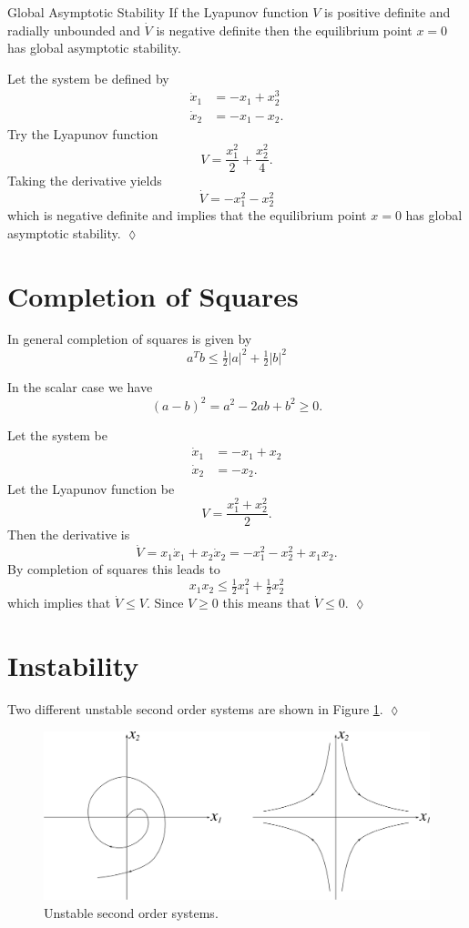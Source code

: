 \begin{theorem}{Global Asymptotic Stability}
If the Lyapunov function $V$ is positive definite and radially unbounded and $\dot{V}$ is negative definite then the equilibrium point $x=0$ has global asymptotic stability.
\end{theorem}

\begin{example}
Let the system be defined by
\begin{align*}
\dot{x}_1 &= -x_1 + x_2^3 \\
\dot{x}_2 &= -x_1 - x_2.
\end{align*}
Try the Lyapunov function
$$V = \frac{x_1^2}{2} + \frac{x_2^2}{4}.$$
Taking the derivative yields
$$\dot{V} = -x_1^2 - x_2^2$$
which is negative definite and implies that the equilibrium point $x=0$ has global asymptotic stability.
$\lozenge$
\end{example}

\section{Completion of Squares}
In general completion of squares is given by
$$a^Tb \leq \tfrac{1}{2}|a|^2 + \tfrac{1}{2}|b|^2$$

In the scalar case we have
$$(a-b)^2 = a^2 - 2ab + b^2 \geq 0.$$

\begin{example}
Let the system be
\begin{align*}
\dot{x}_1 &= -x_1 + x_2 \\
\dot{x}_2 &= -x_2.
\end{align*}
Let the Lyapunov function be
$$V = \frac{x_1^2+x_2^2}{2}.$$
Then the derivative is
$$\dot{V} = x_1\dot{x}_1 + x_2\dot{x}_2 = -x_1^2 - x_2^2 + x_1x_2.$$
By completion of squares this leads to
$$x_1x_2 \leq \tfrac{1}{2}x_1^2 + \tfrac{1}{2}x_2^2$$
which implies that $\dot{V} \leq V$. Since $V \geq 0$ this means that $\dot{V} \leq 0$.
$\lozenge$
\end{example}

\section{Instability}
\begin{example}
Two different unstable second order systems are shown in Figure \ref{fig:10instability}.
$\lozenge$
\end{example}

\begin{figure}[ht!]
	\centering
	\includegraphics[width=.4\textwidth]{images/10instability}
	\caption{Unstable second order systems.}
	\label{fig:10instability}
\end{figure}

